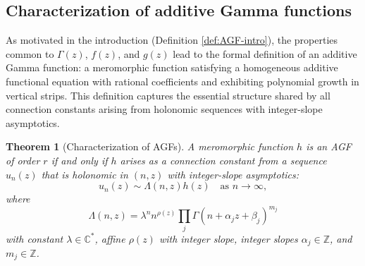 \documentclass[11pt,reqno]{amsart}
\newtheorem{theorem}{Theorem}[section]
\theoremstyle{definition}
\newcommand{\Z}{\mathbb{Z}}
\newcommand{\C}{\mathbb{C}}
\numberwithin{equation}{section}
\begin{document}
\subsection{Characterization of additive Gamma functions}

As motivated in the introduction (Definition \ref{def:AGF-intro}), the properties common to $\Gamma(z)$, $f(z)$, and $g(z)$ lead to the formal definition of an additive Gamma function: a meromorphic function satisfying a homogeneous additive functional equation with rational coefficients and exhibiting polynomial growth in vertical strips. This definition captures the essential structure shared by all connection constants arising from holonomic sequences with integer-slope asymptotics.

\begin{theorem}[Characterization of AGFs]\label{thm:AGF-equivalence}
A meromorphic function $h$ is an AGF of order $r$ if and only if $h$ arises as a connection constant from a sequence $u_n(z)$ that is holonomic in $(n,z)$ with integer-slope asymptotics:
$$u_n(z) \sim \Lambda(n,z)h(z) \quad \text{as } n \to \infty,$$
where
$$\Lambda(n,z) = \lambda^n n^{\rho(z)} \prod_j \Gamma(n+\alpha_j z+\beta_j)^{m_j}$$
with constant $\lambda\in\C^*$, affine $\rho(z)$ with integer slope, integer slopes $\alpha_j\in\Z$, and $m_j\in\Z$.
\end{theorem}
\end{document}
